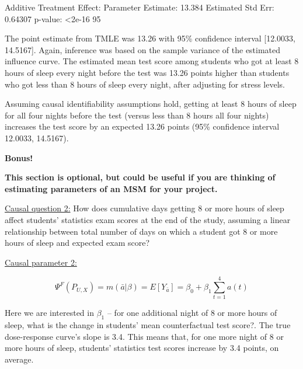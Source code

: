 \documentclass[answers]{exam}
\begin{document}
\begin{solution}
\begin{Schunk}
\begin{Soutput}
Additive Treatment Effect:
   Parameter Estimate:  13.384 
    Estimated Std Err:  0.64307 
              p-value:  <2e-16 
    95%
\end{Soutput}
\end{Schunk}

The point estimate from TMLE was 13.26 with 95\% confidence interval [12.0033, 14.5167]. Again, inference was based on the sample variance of the estimated influence curve. The estimated mean test score among students who got at least 8 hours of sleep every night before the test was 13.26 points higher than students who got less than 8 hours of sleep every night, after adjusting for stress levels.

Assuming causal identifiability assumptions hold, getting at least 8 hours of sleep for all four nights before the test (versus less than 8 hours all four nights) increases the test score by an expected 13.26 points (95\% confidence interval 12.0033, 14.5167).

\end{solution}



\noindent \Large{\textbf{Bonus!}}

\normalsize

\noindent \textbf{This section is optional, but could be useful if you are thinking of estimating parameters of an MSM for your project.}

\noindent \underline{Causal question 2:} How does cumulative days getting 8 or more hours of sleep affect students' statistics exam scores at the end of the study, assuming a linear relationship between total number of days on which a student got 8 or more hours of sleep and expected exam score? 



\noindent\underline{Causal parameter 2:}

\[
\Psi^F(P_{U,X}) = m(\bar{a}|\beta) = E[Y_{\bar{a}}] = \beta_0 + \beta_1 \sum_{t=1}^4a(t)
\]

Here we are interested in $\beta_1$ -- for one additional night of 8 or more hours of sleep, what is the change in students' mean counterfactual test score?. The true dose-response curve's slope is 3.4. This means that, for one more night of 8 or more hours of sleep, students' statistics test scores increase by 3.4 points, on average.
\end{document}
